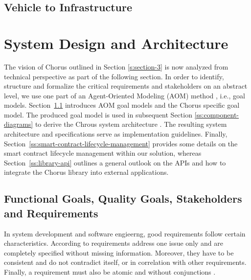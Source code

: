 \documentclass{llncs}
\begin{document}
{			\subsection{Vehicle to Infrastructure}					
		


	
	
	\section{System Design and Architecture}
		\label{s:section-4}	


		The vision of Chorus outlined in Section \ref{s:section-3} is now analyzed from technical perspective as part of the following section. In order to identify, structure and formalize the critical requirements and stakeholders on an abstract level, we use one part of an Agent-Oriented Modeling (AOM) method \cite{sterling2009art}, i.e., goal models. Section~\ref{ss:requirement-engineering} introduces AOM goal models and the Chorus specific goal model. The produced goal model is used in subsequent Section \ref{ss:component-diagrams} to derive the Chrous system architecture . The resulting system architecture and specifications serve as implementation guidelines. Finally, Section~\ref{ss:smart-contract-lifecycle-management} provides some details on the smart contract lifecycle management within our solution, whereas Section~\ref{ss:library-api} outlines a general outlook on the APIs and how to integrate the Chorus library into external applications.
		
		
		
		\subsection{Functional Goals, Quality Goals, Stakeholders and Requirements}
			\label{ss:requirement-engineering}
						
			In system development and software engieerng, good requirements follow certain characteristics. According to \cite{davis1993software}\cite{ieee1994ieee} requirements address one issue only and are completely specified without missing information. Moreover, they have to be consistent and do not contradict itself, or in correlation with other requirements. Finally, a requirement must also be atomic and without conjunctions \cite{norta2014reference}.
			
}
\end{document}
